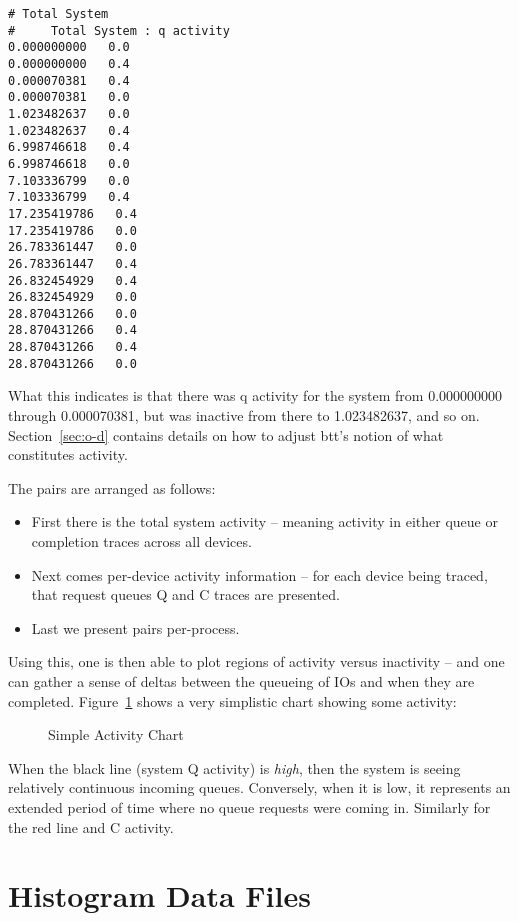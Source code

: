 \documentclass{article}
\begin{document}
\begin{verbatim}
# Total System
#     Total System : q activity
0.000000000   0.0
0.000000000   0.4
0.000070381   0.4
0.000070381   0.0
1.023482637   0.0
1.023482637   0.4
6.998746618   0.4
6.998746618   0.0
7.103336799   0.0
7.103336799   0.4
17.235419786   0.4
17.235419786   0.0
26.783361447   0.0
26.783361447   0.4
26.832454929   0.4
26.832454929   0.0
28.870431266   0.0
28.870431266   0.4
28.870431266   0.4
28.870431266   0.0
\end{verbatim}

  What this indicates is that there was q activity for the system
  from 0.000000000 through 0.000070381, but was inactive from there to
  1.023482637, and so on. Section~\ref{sec:o-d} contains details on how
  to adjust btt's notion of what constitutes activity.

  The pairs are arranged as follows:

  \begin{itemize}
    \item First there is the total system activity -- meaning activity
    in either queue or completion traces across all devices.

    \item Next comes per-device activity information -- for each device
    being traced, that request queues Q and C traces are presented.

    \item Last we present pairs per-process.
  \end{itemize}

  Using this, one is then able to plot regions of activity versus
  inactivity -- and one can gather a sense of deltas between the queueing
  of IOs and when they are completed. Figure~\ref{fig:activity} shows
  a very simplistic chart showing some activity:

  \begin{figure}[hb]
  \leavevmode\centering
  \caption{\label{fig:activity}Simple Activity Chart}
  \end{figure}

  When the black line (system Q activity) is \emph{high}, then the system
  is seeing relatively continuous incoming queues. Conversely, when it is
  low, it represents an extended period of time where no queue requests
  were coming in. Similarly for the red line and C activity.

\newpage\section{\label{sec:hist}Histogram Data Files}
\end{document}
